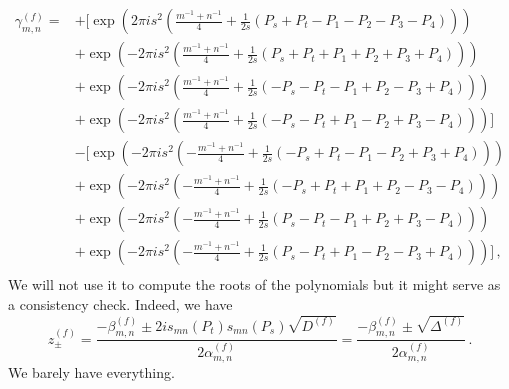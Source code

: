 \documentclass[11pt]{article}
\begin{document}
\begin{equation}
    \begin{aligned}
        \gamma_{m,n}^{(f)}=&+\Bigg[\exp\left(2\pi i s^2\left(\frac{m^{-1}+n^{-1}}{4}+\frac{1}{2s}(P_s+P_t-P_1-P_2-P_3-P_4)\right)\right)\\
        &+\exp\left(-2\pi i s^2\left(\frac{m^{-1}+n^{-1}}{4}+\frac{1}{2s}(P_s+P_t+P_1+P_2+P_3+P_4)\right)\right)\\
        &+\exp\left(-2\pi i s^2\left(\frac{m^{-1}+n^{-1}}{4}+\frac{1}{2s}(-P_s-P_t-P_1+P_2-P_3+P_4)\right)\right)\\
        &+\exp\left(-2\pi i s^2\left(\frac{m^{-1}+n^{-1}}{4}+\frac{1}{2s}(-P_s-P_t+P_1-P_2+P_3-P_4)\right)\right) \Bigg]\\
        &-\Bigg[\exp\left(-2\pi i s^2\left(-\frac{m^{-1}+n^{-1}}{4}+\frac{1}{2s}(-P_s+P_t-P_1-P_2+P_3+P_4)\right)\right)\\
        &+\exp\left(-2\pi i s^2\left(-\frac{m^{-1}+n^{-1}}{4}+\frac{1}{2s}(-P_s+P_t+P_1+P_2-P_3-P_4)\right)\right)\\
        &+\exp\left(-2\pi i s^2\left(-\frac{m^{-1}+n^{-1}}{4}+\frac{1}{2s}(P_s-P_t-P_1+P_2+P_3-P_4)\right)\right)\\
        &+\exp\left(-2\pi i s^2\left(-\frac{m^{-1}+n^{-1}}{4}+\frac{1}{2s}(P_s-P_t+P_1-P_2-P_3+P_4)\right)\right) \Bigg]\,,\\
    \end{aligned}
\end{equation}
We will not use it to compute the roots of the polynomials but it might serve as a consistency check. Indeed, we have
\begin{equation}
    z_{\pm}^{(f)}=\frac{-\beta_{m,n}^{(f)}\pm2i s_{mn}(P_t)s_{mn}(P_s)\sqrt{D^{(f)}}}{2\alpha_{m,n}^{(f)}}=\frac{-\beta_{m,n}^{(f)}\pm\sqrt{\Delta^{(f)}}}{2\alpha_{m,n}^{(f)}}\,.
\end{equation}
We barely have everything.
\end{document}
